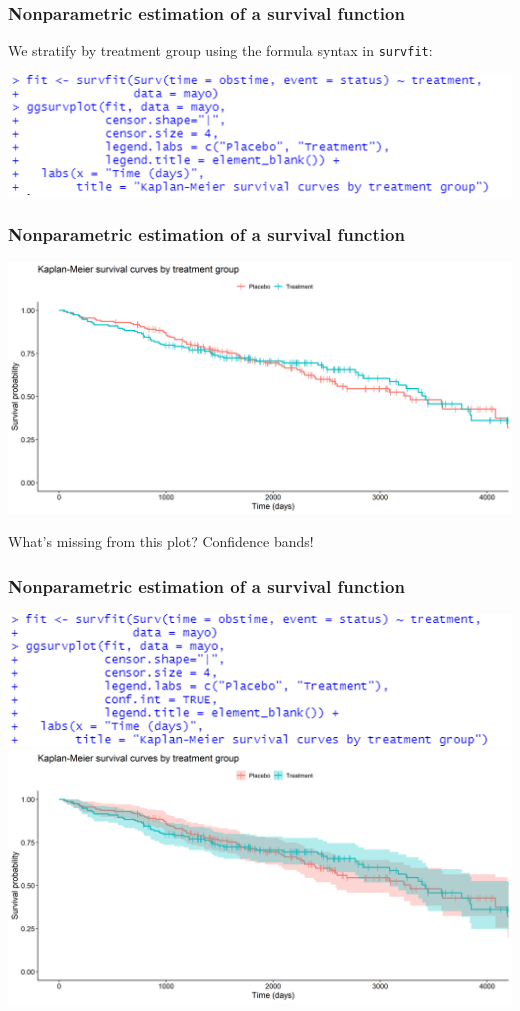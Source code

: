 \documentclass[10pt,t]{beamer}
\begin{document}
\begin{frame}
	\frametitle{Nonparametric estimation of a survival function} 
	We stratify by treatment group using the formula syntax in \texttt{survfit}:
	\begin{center}
		\includegraphics[width=\textwidth]{figs/KM_strat_code.png}
	\end{center}
\end{frame}

\begin{frame}
	\frametitle{Nonparametric estimation of a survival function} 
	\begin{center}
		\includegraphics[width=\textwidth]{figs/KM_strat.png}
	\end{center}
	What's missing from this plot?   Confidence bands!
\end{frame}

\begin{frame}
	\frametitle{Nonparametric estimation of a survival function} 
	\begin{center}
			\includegraphics[height=0.3\textheight]{figs/KM_strat_CI_code.png}
		\includegraphics[width=\textwidth]{figs/KM_strat_CI.png}
	\end{center}
\end{frame}
\end{document}
